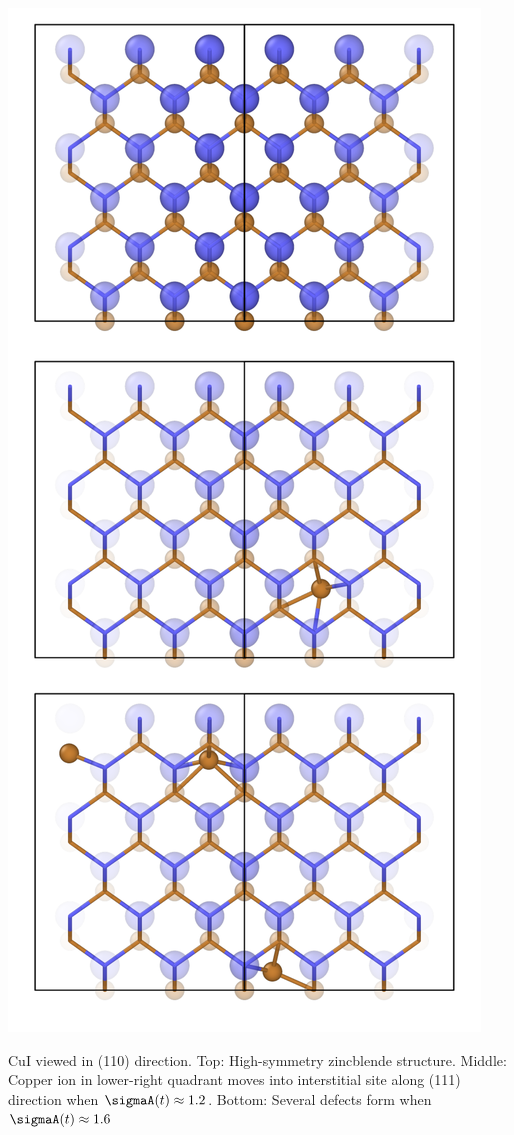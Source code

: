 \begin{marginfigure}
	\includegraphics[width=\textwidth]{./data/plots/defects/216.02.CuI/all.pdf}
	\caption{CuI viewed in (110) direction. Top: High-symmetry zincblende structure. Middle: Copper ion in lower-right quadrant moves into interstitial site along (111) direction when $\sigmaA (t) \approx 1.2$. Bottom: Several defects form when $\sigmaA (t) \approx 1.6$}
	\label{fig:defects.CuI.1}
\end{marginfigure} 

